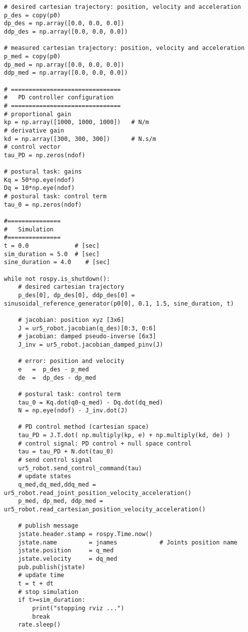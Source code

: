\begin{lstlisting}
# desired cartesian trajectory: position, velocity and acceleration
p_des = copy(p0)
dp_des = np.array([0.0, 0.0, 0.0])
ddp_des = np.array([0.0, 0.0, 0.0])

# measured cartesian trajectory: position, velocity and acceleration
p_med = copy(p0)
dp_med = np.array([0.0, 0.0, 0.0])
ddp_med = np.array([0.0, 0.0, 0.0])

# ===============================
#   PD controller configuration
# ===============================
# proportional gain
kp = np.array([1000, 1000, 1000])   # N/m
# derivative gain   
kd = np.array([300, 300, 300])      # N.s/m
# control vector
tau_PD = np.zeros(ndof)    

# postural task: gains
Kq = 50*np.eye(ndof)
Dq = 10*np.eye(ndof)
# postural task: control term
tau_0 = np.zeros(ndof)

#===============
#   Simulation
#===============
t = 0.0             # [sec] 
sim_duration = 5.0  # [sec]
sine_duration = 4.0    # [sec]

while not rospy.is_shutdown():
    # desired cartesian trajectory
    p_des[0], dp_des[0], ddp_des[0] = sinusoidal_reference_generator(p0[0], 0.1, 1.5, sine_duration, t)

    # jacobian: position xyz [3x6]
    J = ur5_robot.jacobian(q_des)[0:3, 0:6]  
    # jacobian: damped pseudo-inverse [6x3]
    J_inv = ur5_robot.jacobian_damped_pinv(J)   

    # error: position and velocity
    e 	=  p_des - p_med
    de 	=  dp_des - dp_med    

    # postural task: control term
    tau_0 = Kq.dot(q0-q_med) - Dq.dot(dq_med)
    N = np.eye(ndof) - J_inv.dot(J)
    
    # PD control method (cartesian space)
    tau_PD = J.T.dot( np.multiply(kp, e) + np.multiply(kd, de) )
    # control signal: PD control + null space control
    tau = tau_PD + N.dot(tau_0)
    # send control signal
    ur5_robot.send_control_command(tau)
    # update states
    q_med,dq_med,ddq_med = ur5_robot.read_joint_position_velocity_acceleration()
    p_med, dp_med, ddp_med = ur5_robot.read_cartesian_position_velocity_acceleration()

    # publish message
    jstate.header.stamp = rospy.Time.now()
    jstate.name 		= jnames			# Joints position name
    jstate.position 	= q_med
    jstate.velocity 	= dq_med
    pub.publish(jstate)
    # update time
    t = t + dt
    # stop simulation
    if t>=sim_duration:
        print("stopping rviz ...")
        break
    rate.sleep()
\end{lstlisting}

